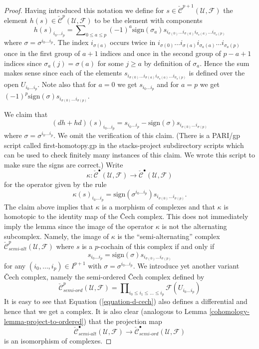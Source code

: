 \begin{proof}
\medskip\noindent
Having introduced this notation we define for
$s \in \check{\mathcal{C}}^{p + 1}(\mathcal{U}, \mathcal{F})$
the element $h(s) \in \check{\mathcal{C}}^p(\mathcal{U}, \mathcal{F})$
to be the element with components
\begin{equation}
\label{equation-first-homotopy}
h(s)_{i_0\ldots i_p} =
\sum\nolimits_{0 \leq a \leq p}
(-1)^a \text{sign}(\sigma_a)
s_{i_{\sigma(0)} \ldots i_{\sigma(a)} i_{\sigma_a(a)} \ldots i_{\sigma_a(p)}}
\end{equation}
where $\sigma = \sigma^{i_0 \ldots i_p}$. The index
$i_{\sigma(a)}$ occurs twice in
$i_{\sigma(0)} \ldots i_{\sigma(a)} i_{\sigma_a(a)} \ldots i_{\sigma_a(p)}$
once in the first group of $a + 1$ indices and once in the second group
of $p - a + 1$ indices since $\sigma_a(j) = \sigma(a)$ for some
$j \geq a$ by definition of $\sigma_a$. Hence the sum makes sense since each
of the elements
$s_{i_{\sigma(0)} \ldots i_{\sigma(a)} i_{\sigma_a(a)} \ldots i_{\sigma_a(p)}}$
is defined over the open $U_{i_0 \ldots i_p}$.
Note also that for $a = 0$ we get $s_{i_0 \ldots i_p}$ and
for $a = p$ we get
$(-1)^p \text{sign}(\sigma) s_{i_{\sigma(0)} \ldots i_{\sigma(p)}}$.

\medskip\noindent
We claim that
$$
(dh + hd)(s)_{i_0 \ldots i_p} =
s_{i_0 \ldots i_p} -
\text{sign}(\sigma) s_{i_{\sigma(0)} \ldots i_{\sigma(p)}}
$$
where $\sigma = \sigma^{i_0 \ldots i_p}$. We omit the verification
of this claim. (There is a PARI/gp script called first-homotopy.gp
in the stacks-project subdirectory scripts which can be used to check
finitely many instances of this claim.
We wrote this script to make sure the signs are correct.)
Write
$$
\kappa :
\check{\mathcal{C}}^\bullet(\mathcal{U}, \mathcal{F})
\longrightarrow
\check{\mathcal{C}}^\bullet(\mathcal{U}, \mathcal{F})
$$
for the operator given by the rule
$$
\kappa(s)_{i_0 \ldots i_p} =
\text{sign}(\sigma^{i_0 \ldots i_p}) s_{i_{\sigma(0)} \ldots i_{\sigma(p)}}.
$$
The claim above implies that $\kappa$ is a morphism of complexes and that
$\kappa$ is homotopic to the identity map of the {\v C}ech complex.
This does not immediately imply the lemma since
the image of the operator $\kappa$ is not the alternating subcomplex.
Namely, the image of $\kappa$ is the ``semi-alternating'' complex
$\check{\mathcal{C}}_{semi\text{-}alt}^p(\mathcal{U}, \mathcal{F})$
where $s$ is a $p$-cochain of this complex if and only if
$$
s_{i_0 \ldots i_p} = \text{sign}(\sigma) s_{i_{\sigma(0)} \ldots i_{\sigma(p)}}
$$
for any $(i_0, \ldots, i_p) \in I^{p + 1}$ with
$\sigma = \sigma^{i_0 \ldots i_p}$.
We introduce yet another variant {\v C}ech complex, namely the semi-ordered
{\v C}ech complex defined by
$$
\check{\mathcal{C}}_{semi\text{-}ord}^p(\mathcal{U}, \mathcal{F})
=
\prod\nolimits_{i_0 \leq i_1 \leq \ldots \leq i_p}
\mathcal{F}(U_{i_0 \ldots i_p})
$$
It is easy to see that Equation (\ref{equation-d-cech}) also defines
a differential and hence that we get a complex. It is also clear
(analogous to Lemma \ref{cohomology-lemma-project-to-ordered}) that the projection map
$$
\check{\mathcal{C}}_{semi\text{-}alt}^\bullet(\mathcal{U}, \mathcal{F})
\longrightarrow
\check{\mathcal{C}}_{semi\text{-}ord}^\bullet(\mathcal{U}, \mathcal{F})
$$
is an isomorphism of complexes.


\end{proof}
